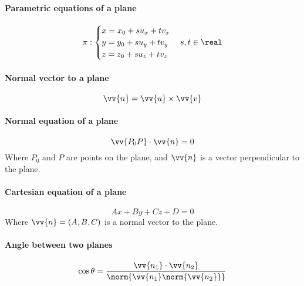 \paragraph{Parametric equations of a plane}
	\begin{equation}
		\pi:
		\begin{cases}
			x = x_0 + su_x + tv_x\\
			y = y_0 + su_y + tv_y\\
			z = z_0 + su_z + tv_z
		\end{cases}
		s, t \in \real
	\end{equation}
\paragraph{Normal vector to a plane}
	\begin{equation}
		\vv{n} = \vv{u} \times \vv{v}
	\end{equation}
\paragraph{Normal equation of a plane}
	\begin{equation}
		\vv{P_0P} \cdot \vv{n} = 0
	\end{equation}
	Where $P_0$ and $P$ are points on the plane, and $\vv{n}$ is a vector perpendicular to the plane.
\paragraph{Cartesian equation of a plane}
	\begin{equation}
		Ax + By + Cz + D = 0
	\end{equation}
	Where $\vv{n} = (A,B,C)$ is a normal vector to the plane.
\paragraph{Angle between two planes}
	\begin{equation}
		\cos \theta = \frac{\vv{n_1} \cdot \vv{n_2}}{\norm{\vv{n_1} \norm{\vv{n_2}}}}
	\end{equation}
